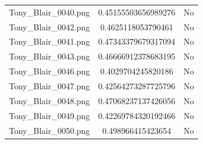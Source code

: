 \documentclass[12pt]{article}
\begin{document}
\begin{center}
\begin{tabular}{ccc}
Tony\_Blair\_0040.png & 0.45155503656989276 & No\\
Tony\_Blair\_0042.png & 0.4625118053790461 & No\\
Tony\_Blair\_0041.png & 0.47343379679317094 & No\\
Tony\_Blair\_0043.png & 0.46666912378683195 & No\\
Tony\_Blair\_0046.png & 0.4029704245820186 & No\\
Tony\_Blair\_0047.png & 0.42564273287725796 & No\\
Tony\_Blair\_0048.png & 0.47068237137426056 & No\\
Tony\_Blair\_0049.png & 0.42269784320192466 & No\\
Tony\_Blair\_0050.png & 0.498966415423654 & No\\
\end{tabular}


\end{center}
\end{document}
